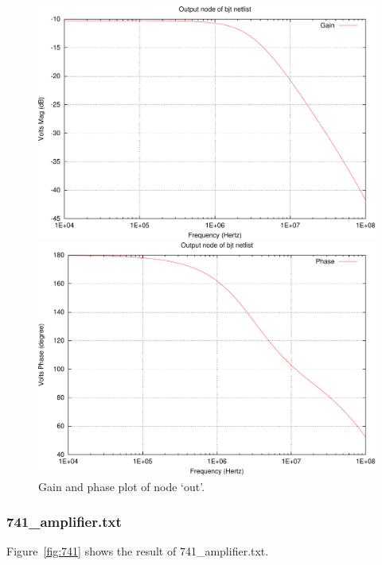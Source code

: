 \documentclass[12pt]{article}
\begin{document}
\begin{figure}[htbp]
  \centering
    \includegraphics[width=.8\textwidth]{bjt_out_g-crop.pdf}

    \vspace{2em}

    \includegraphics[width=.8\textwidth]{bjt_out_p-crop.pdf}
  \caption{Gain and phase plot of node `out'.}
  \label{fig:bjt}
\end{figure}


\subsubsection{741\_amplifier.txt}
Figure~\ref{fig:741} shows the result of 741\_amplifier.txt.
\end{document}
